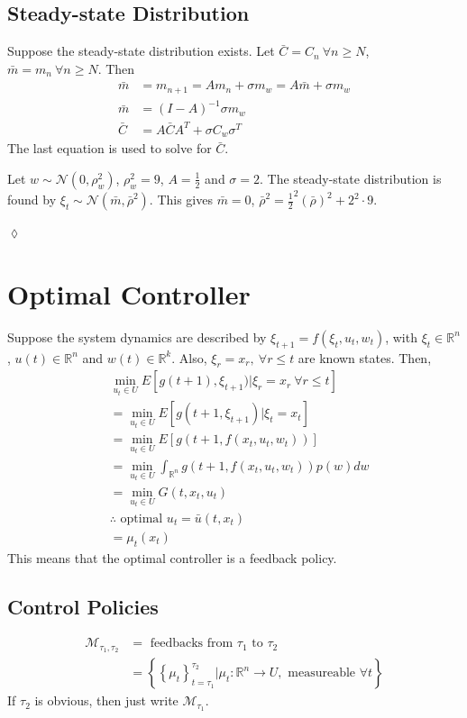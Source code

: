 \subsection{Steady-state Distribution}
Suppose the steady-state distribution exists. Let $\bar{C} = C_n ~\forall n\geq N$, $\bar{m} = m_n ~\forall n\geq N$. Then
\begin{align*}
\bar{m} &= m_{n+1} = Am_n + \sigma m_w = A\bar{m} + \sigma m_w \\
\bar{m} &= (I-A)^{-1}\sigma m_w \\
\bar{C} &= A\bar{C}A^T + \sigma C_w\sigma^T
\end{align*}
The last equation is used to solve for $\bar{C}$.

\begin{example}
Let $w\sim\mathcal{N}(0,\rho_w^2)$, $\rho_w^2=9$, $A=\frac{1}{2}$ and $\sigma=2$. The steady-state distribution is found by $\xi_t \sim\mathcal{N}(\bar{m}, \bar{\rho}^2)$. This gives $\bar{m}=0$, $\bar{\rho}^2 = \frac{1}{2}^2(\bar{\rho})^2 + 2^2\cdot 9$.
\end{example}
$\lozenge$

\section{Optimal Controller}
Suppose the system dynamics are described by $\xi_{t+1} = f(\xi_t,u_t,w_t)$, with $\xi_t\in\mathbb{R}^n$, $u(t)\in\mathbb{R}^n$ and $w(t)\in\mathbb{R}^k$. Also, $\xi_r=x_r, ~\forall r\leq t$ are known states. Then,
\begin{align*}
&\min_{u_t\in U} E[g(t+1),\xi_{t+1}) | \xi_r=x_r ~\forall r\leq t] \\
&= \min_{u_t\in U} E[g(t+1,\xi_{t+1}) | \xi_t=x_t] \\
&= \min_{u_t\in U} E[g(t+1, f(x_t,u_t,w_t))] \\
&= \min_{u_t\in U} \int_{\mathbb{R}^n} g(t+1,f(x_t,u_t,w_t))p(w)dw \\
&= \min_{u_t\in U} G(t,x_t,u_t) \\
&\therefore \text{ optimal } u_t=\bar{u}(t,x_t) \\
&= \mu_t(x_t)
\end{align*}
This means that the optimal controller is a feedback policy.

\subsection{Control Policies}
\begin{align*}
\mathcal{M}_{\tau_1,\tau_2} &= \text{ feedbacks from } \tau_1 \text{ to } \tau_2 \\
&= \left\lbrace\left\lbrace\mu_t\right\rbrace_{t=\tau_1}^{\tau_2} | \mu_t: \mathbb{R}^n \to U, \text{ measureable } \forall t\right\rbrace
\end{align*}
If $\tau_2$ is obvious, then just write $\mathcal{M}_{\tau_1}$.

